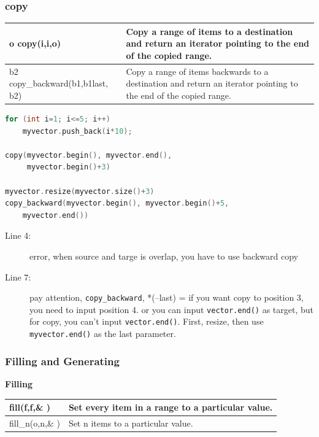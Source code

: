 \documentclass[a4paper,11pt,twoside]{book}
\newcommand{\tophline}{\hline }
\newcommand{\bottomhline}{\\ \hline }
\newcommand{\tophline}{ }
\newcommand{\bottomhline}{ }
\begin{document}
\subsubsection{copy}

\begin{tabular}{| p{} |p{}|}
\tophline o copy(i,i,o) & Copy a range of items to a destination and return an iterator pointing to the end of the copied range.   \\
\tophline b2 copy\_backward(b1,b1last, b2)  & Copy a range of items backwards to a destination and return an iterator pointing to the end of the copied range.    \bottomhline
\end{tabular}



\begin{lstlisting}[frame=single, language=c++]
for (int i=1; i<=5; i++)
    myvector.push_back(i*10);

copy(myvector.begin(), myvector.end(),
	 myvector.begin()+3)

myvector.resize(myvector.size()+3)
copy_backward(myvector.begin(), myvector.begin()+5, 
	myvector.end())
\end{lstlisting}
\begin{description}
	\item[Line 4:] error, when source and targe is overlap, you have to use backward copy
	\item[Line 7:]pay attention, \texttt{copy\_backward}, *(--last) = if you want copy to position 3, you need to input position 4. or you can input \texttt{vector.end()} as target, but for copy, you can't input \texttt{vector.end()}. First, resize, then use\texttt{ myvector.end()} as the last parameter.

\end{description} 

\subsubsection{Filling and Generating}
\textbf{Filling} \\
\begin{tabular}{| p{} |p{}|}
\tophline fill(f,f,\& ) & Set every item in a range to a particular value.  \\
\tophline fill\_n(o,n,\& )  & Set n items to a particular value.   \bottomhline
\end{tabular} \\
\end{document}
